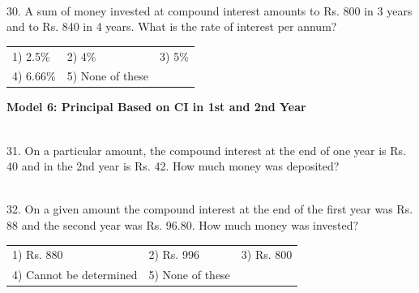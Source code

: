 \documentclass{article}
\begin{document}
	\noindent 
	
	\noindent 
	
	\noindent 
	
	\noindent  \\ 30. A sum of money invested at compound interest amounts to Rs. 800 in 3 years and to Rs. 840 in 4 years. What is the rate of interest per annum?
	
	\noindent \begin{tabular}{p{1.7in} p{1.6in} p{1.6in}} \\ 
 1) 2.5\%                   &  2) 4\%                &  3) 5\%                \\
4) 6.66\%           & 5) None of these  \\
\end{tabular}
	
	\noindent 
	
	\noindent 
	
	\noindent 
	
	\noindent 
	
	\noindent 
	
	\noindent \textbf{Model 6: Principal Based on CI in 1st and 2nd Year}
	
	\noindent 
	
	\noindent  \\ 
	
	31. On a particular amount, the compound interest at the end of one year is Rs. 40 and in the 2nd  year is Rs. 42. How much money was deposited?
	
	\noindent 
	
	\noindent 
	
	\noindent 
	
	\noindent 
	
	\noindent 
	
	\noindent 
	
	\noindent 
	
	\noindent 
	
	\noindent  \\ 32. On a given amount the compound interest at the end of the first year was Rs. 88 and the second year was Rs. 96.80.  How much money was invested?
	
	\noindent \begin{tabular}{p{1.7in} p{1.6in} p{1.6in}} \\ 
 1) Rs. 880                                                          &  2) Rs. 996                                      &  3) Rs. 800
	
	\noindent 
	
	\noindent \\
4) Cannot be determined                            & 5) None of these  \\
\end{tabular}
	
\end{document}
